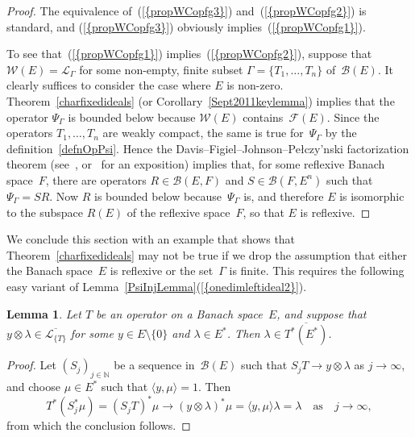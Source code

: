 \documentclass[12pt]{amsart}
\newtheorem{lemma}[theorem]{Lemma}
\theoremstyle{definition}
\numberwithin{equation}{section}
\begin{document}
\begin{proof} The equivalence of~{{\normalfont\textrm{(\ref{{propWCopfg3}})}}}
  and~{{\normalfont\textrm{(\ref{{propWCopfg2}})}}} is standard, and {{\normalfont\textrm{(\ref{{propWCopfg3}})}}}
  obviously implies~{{\normalfont\textrm{(\ref{{propWCopfg1}})}}}.

  To see that~{{\normalfont\textrm{(\ref{{propWCopfg1}})}}} implies~{{\normalfont\textrm{(\ref{{propWCopfg2}})}}},
  suppose that $\mathscr{W}(E) = \mathscr{L}_{\Gamma}$ for some
  non-empty, finite subset $\Gamma = \{T_1,\ldots,T_n\}$
  of~$\mathscr{B}(E)$. It clearly suffices to consider the case where
  $E$ is non-zero.  Theorem~\ref{charfixedideals} (or
  Corollary~\ref{Sept2011keylemma}) implies that the operator
  $\Psi_{\Gamma}$ is bounded below because $\mathscr{W}(E)$
  contains~$\mathscr{F}(E)$. Since the operators $T_1,\ldots,T_n$ are
  weakly compact, the same is true for~$\Psi_{\Gamma}$ by the
  definition~\eqref{defnOpPsi}. Hence the
  Davis--Figiel--Johnson--Pe{\l}czy{\a'n}ski factorization theorem
  (see~\cite{dfjp}, or~\cite[Theorem~2.g.11]{lt2} for an exposition)
  implies that, for some reflexive Banach space~$F$, there are
  operators $R\in\mathscr{B}(E,F)$ and $S\in\mathscr{B}(F,E^n)$ such
  that $\Psi_{\Gamma} = SR$. Now $R$ is bounded below
  because~$\Psi_{\Gamma}$ is, and there\-fore $E$ is isomorphic to the
  subspace $R(E)$ of the reflexive space~$F$, so that $E$ is
  reflexive. \end{proof}

We conclude this section with an example that shows that
Theorem~\ref{charfixedideals} may not be true if we drop the
assumption that either the Banach space~$E$ is reflexive or the
set~$\Gamma$ is finite. This requires the following easy variant of
Lemma~\ref{PsiInjLemma}{{\normalfont\textrm{(\ref{{onedimleftideal2}})}}}.

\begin{lemma}\label{lemma5712}
  Let $T$ be an operator on a Banach space~$E$, and suppose that
  $y\otimes\lambda\in\overline{\mathscr{L}_{\{T\}}}$ for some $y\in
  E\setminus\{0\}$ and $\lambda\in E^*$. Then
  $\lambda\in\overline{T^*(E^*)}$.
\end{lemma}

\begin{proof}
  Let $(S_j)_{j\in{\ensuremath{\mathbb{N}}}}$ be a sequence in~$\mathscr{B}(E)$ such that
  $S_jT\to y\otimes\lambda$ as $j\to\infty$, and choose $\mu\in E^*$
  such that $\langle y,\mu\rangle = 1$.  Then
  \[ T^*(S_j^*\mu) = (S_jT)^*\mu\to (y\otimes\lambda)^*\mu = \langle
  y,\mu\rangle\lambda = \lambda\quad\text{as}\quad j\to\infty, \]
  from which the conclusion follows.
\end{proof}
\end{document}
